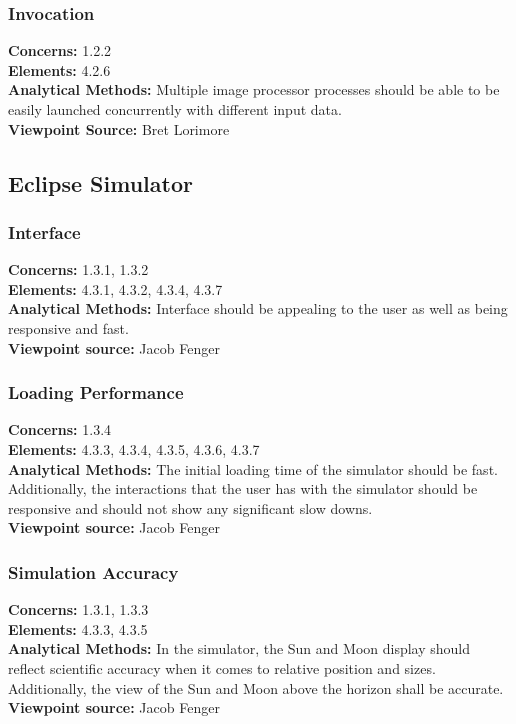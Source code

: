 \documentclass[10pt, onecolumn, draftclsnofoot, letterpaper, compsoc]{IEEEtran}
\begin{document}
    \subsubsection{Invocation}
    \textbf{Concerns:} 1.2.2 \\
    \textbf{Elements:} 4.2.6 \\
    \textbf{Analytical Methods:} Multiple image processor processes should be able to be easily launched 
    concurrently with different input data. \\
    \textbf{Viewpoint Source:} Bret Lorimore \\

\subsection{Eclipse Simulator}
  \subsubsection{Interface}
  \textbf{Concerns:} 1.3.1, 1.3.2 \\
  \textbf{Elements:} 4.3.1, 4.3.2, 4.3.4, 4.3.7 \\
  \textbf{Analytical Methods:} Interface should be appealing
  to the user as well as being responsive and fast. \\
  \textbf{Viewpoint source:} Jacob Fenger \\

  \subsubsection{Loading Performance}
  \textbf{Concerns:} 1.3.4\\
  \textbf{Elements:} 4.3.3, 4.3.4, 4.3.5, 4.3.6, 4.3.7 \\
  \textbf{Analytical Methods:} The initial loading time
  of the simulator should be fast. Additionally, the
  interactions that the user has with the simulator should
  be responsive and should not show any significant slow
  downs. \\
  \textbf{Viewpoint source:} Jacob Fenger \\

  \subsubsection{Simulation Accuracy}
  \textbf{Concerns:} 1.3.1, 1.3.3 \\
  \textbf{Elements:} 4.3.3, 4.3.5 \\
  \textbf{Analytical Methods:} In the simulator, the Sun and
  Moon display should reflect scientific accuracy when it
  comes to relative position and sizes. Additionally, the
  view of the Sun and Moon above the horizon shall be
  accurate.\\
  \textbf{Viewpoint source:} Jacob Fenger \\
\end{document}
